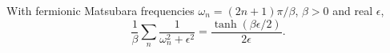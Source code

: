 \documentclass{article}
\begin{document}
With fermionic Matsubara frequencies $\omega_n = (2n+1)\pi/\beta$, $\beta>0$ and real $\epsilon$,
\begin{equation}
\frac{1}{\beta}\sum_{n} \frac{1}{\omega_n^2+\epsilon^2} = \frac{\tanh(\beta\epsilon/2)}{2\epsilon} .
\label{eq:s}
\end{equation}
\end{document}

